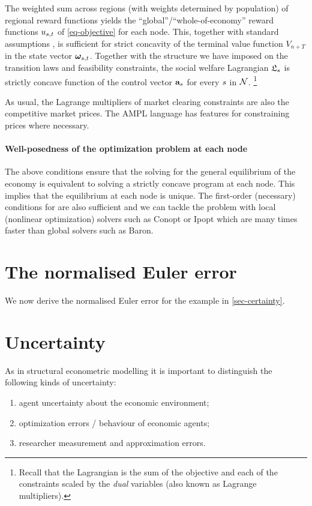 \documentclass[12pt,a4paper,twoside, draft]{article}
\begin{document}
The weighted sum across regions (with weights determined by population) of
regional reward functions yields the ``global''/``whole-of-economy'' reward
functions ${u}_{{s}, t}$ of \eqref{eq-objective} for each node.
This, together with standard assumptions
\citep[Theorem 12.2.12]{Stachurski-Economic_dynamics}, is sufficient for strict
concavity of the terminal value function ${V}_{n + T}$ in the state
vector $\boldsymbol{\omega}_{{s}, t}$.
Together with the structure we have imposed on the transition laws and
feasibility constraints, the social welfare Lagrangian $\mathfrak L_{{s}}$ is
strictly concave function of the control vector $\mathbf{a}_{{s}}$ for every
${s}$ in $\mathcal N$.
\footnote{
Recall that the Lagrangian is the sum of the objective and each of the
constraints scaled by the \emph{dual} variables (also known as Lagrange
multipliers).
}
\begin{remark*}
As usual, the Lagrange multipliers of market clearing constraints are also the
competitive market prices.
The AMPL language has features for constraining prices where necessary.
\end{remark*}
\paragraph{Well-posedness of the optimization problem at each node}
The above conditions ensure that the solving for the general equilibrium of the
economy is equivalent to solving a strictly concave program at each node.
This implies that the equilibrium at each node is unique.
The first-order (necessary) conditions for are also sufficient and we can
tackle the problem with local (nonlinear optimization) solvers such as Conopt
or Ipopt which are many times faster than global solvers such as Baron.
\section{The normalised Euler error}
We now derive the normalised Euler error for the example in
\cref{sec-certainty}.

\section{Uncertainty}
As in structural econometric modelling
\citep{Reiss_Wolak-Structural_econometrics} it is important to distinguish the
following kinds of uncertainty:
\begin{enumerate}[I]
   \item\label{aue} agent uncertainty about the economic environment;
   \item\label{aub} optimization errors / behaviour of economic agents;
   \item\label{rum} researcher measurement and approximation errors.
\end{enumerate}
\end{document}
